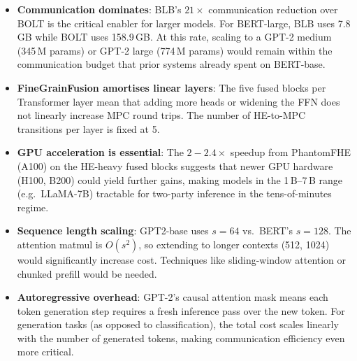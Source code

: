 \begin{itemize}[nosep]
  \item \textbf{Communication dominates}: BLB's $21\times$ communication reduction over BOLT is the critical enabler for larger models. For BERT-large, BLB uses 7.8\,GB while BOLT uses 158.9\,GB. At this rate, scaling to a GPT-2 medium (345\,M params) or GPT-2 large (774\,M params) would remain within the communication budget that prior systems already spent on BERT-base.
  \item \textbf{FineGrainFusion amortises linear layers}: The five fused blocks per Transformer layer mean that adding more heads or widening the FFN does not linearly increase MPC round trips. The number of HE-to-MPC transitions per layer is fixed at 5.
  \item \textbf{GPU acceleration is essential}: The $2{-}2.4\times$ speedup from PhantomFHE (A100) on the HE-heavy fused blocks suggests that newer GPU hardware (H100, B200) could yield further gains, making models in the 1\,B--7\,B range (e.g.\ LLaMA-7B) tractable for two-party inference in the tens-of-minutes regime.
  \item \textbf{Sequence length scaling}: GPT2-base uses $s{=}64$ vs.\ BERT's $s{=}128$. The attention matmul is $O(s^2)$, so extending to longer contexts (512, 1024) would significantly increase cost. Techniques like sliding-window attention or chunked prefill would be needed.
  \item \textbf{Autoregressive overhead}: GPT-2's causal attention mask means each token generation step requires a fresh inference pass over the new token. For generation tasks (as opposed to classification), the total cost scales linearly with the number of generated tokens, making communication efficiency even more critical.
\end{itemize}
